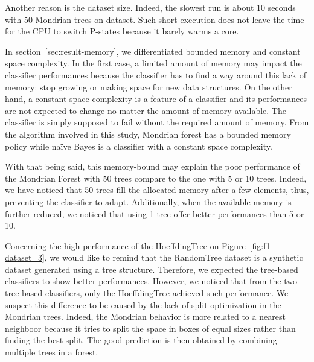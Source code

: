 Another reason is the dataset size. Indeed, the slowest run is about
10 seconds with 50 Mondrian trees on \recofitdataset dataset.  Such short
execution does not leave the time for the CPU to switch P-states because it
barely warms a core.

In section~\ref{sec:result-memory}, we differentiated bounded memory and
constant space complexity. In the first case, a limited amount of memory
may impact the classifier performances because the classifier has to find a way
around this lack of memory: stop growing or making space for new data structures.
On the other hand, a constant space complexity is a feature of a classifier and
its performances are not expected to change no  matter the amount of memory
available. The classifier is simply supposed to fail without the required
amount of memory. From the algorithm involved in this study, Mondrian forest
has a bounded memory policy while naïve Bayes is a classifier with a constant
space complexity.

With that being said, this memory-bound may explain the poor performance of the
Mondrian Forest with 50 trees compare to the one with 5 or 10 trees. Indeed, we
have noticed that 50 trees fill the allocated memory after a few elements,
thus, preventing the classifier to adapt. Additionally, when the available
memory is further reduced, we noticed that using 1 tree offer better
performances than 5 or 10.

Concerning the high performance of the HoeffdingTree on
Figure~\ref{fig:f1-dataset_3}, we would like to remind that the RandomTree
dataset is a synthetic dataset generated using a tree structure. Therefore, we
expected the tree-based classifiers to show better performances.  However, we
noticed that from the two tree-based classifiers, only the HoeffdingTree
achieved such performance.  We suspect this difference to be caused by the lack
of split optimization in the Mondrian trees. Indeed, the Mondrian behavior is
more related to a nearest neighboor because it tries to split the space in
boxes of equal sizes rather than finding the best split. The good prediction is
then obtained by combining multiple trees in a forest.




